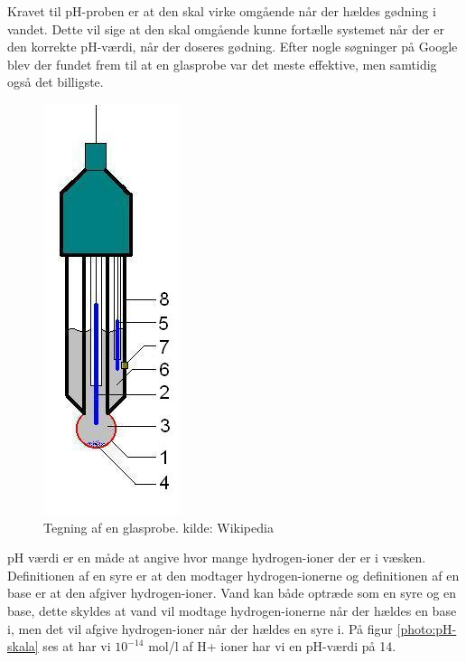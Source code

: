 
Kravet til pH-proben er at den skal virke omgående når der hældes gødning i vandet. Dette vil sige at den skal omgående kunne fortælle systemet når der er den korrekte pH-værdi, når der doseres gødning. Efter nogle søgninger på Google blev der fundet frem til at en glasprobe var det meste effektive, men samtidig også det billigste. 

\begin{figure}[H]
	\centering 
	\includegraphics[scale=0.7]{HardwareArkitektur/Sensore/pH_probe_billeder/Glass_electrode_wiki.jpg}
	\caption{Tegning af en glasprobe. kilde: Wikipedia}
	\label{photo:pH-probe}
\end{figure}     

pH værdi er en måde at angive hvor mange hydrogen-ioner der er i væsken. Definitionen af en syre er at den modtager hydrogen-ionerne og definitionen af en base er at den afgiver hydrogen-ioner. Vand kan både optræde som en syre og en base, dette skyldes at vand vil modtage hydrogen-ionerne når der hældes en base i, men det vil afgive hydrogen-ioner når der hældes en syre i. På figur \ref{photo:pH-skala} ses at har vi $10^{-14}$ mol/l af H+ ioner har vi en pH-værdi på 14. 

